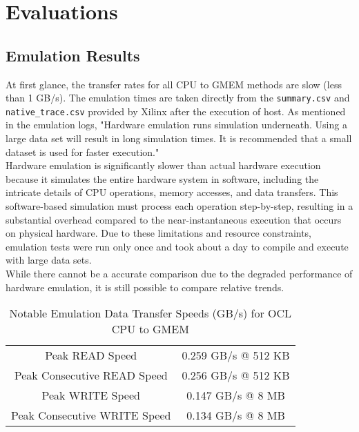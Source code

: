 \section{Evaluations}

\subsection{Emulation Results}
At first glance, the transfer rates for all CPU to GMEM methods are slow (less than 1 GB/s). The emulation times are taken directly from the \texttt{summary.csv} and \texttt{native\_trace.csv} provided by Xilinx after the execution of host. As mentioned in the emulation logs, "Hardware emulation runs simulation underneath. Using a large data set will result in long simulation times. It is recommended that a small dataset is used for faster execution." \\

Hardware emulation is significantly slower than actual hardware execution because it simulates the entire hardware system in software, including the intricate details of CPU operations, memory accesses, and data transfers. This software-based simulation must process each operation step-by-step, resulting in a substantial overhead compared to the near-instantaneous execution that occurs on physical hardware. Due to these limitations and resource constraints, emulation tests were run only once and took about a day to compile and execute with large data sets. \\

While there cannot be a accurate comparison due to the degraded performance of hardware emulation, it is still possible to compare relative trends. \\

\begin{table}[H]
    \centering
    \begin{tabular}{c|c}
         Peak READ Speed & 0.259 GB/s @ 512 KB \\
         Peak Consecutive READ Speed & 0.256 GB/s @ 512 KB \\
         Peak WRITE Speed & 0.147 GB/s @ 8 MB \\
         Peak Consecutive WRITE Speed & 0.134 GB/s @ 8 MB \\
    \end{tabular}
    \caption{Notable Emulation Data Transfer Speeds (GB/s) for OCL CPU to GMEM}
    \label{tab:my_label}
\end{table}

